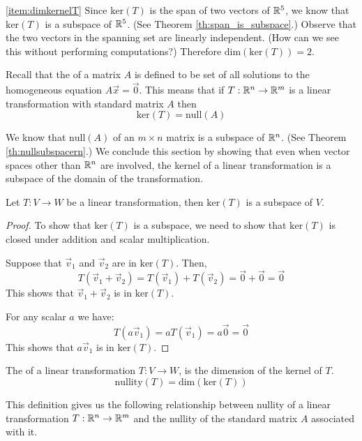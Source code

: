 \documentclass{ximera}
\begin{document}
\begin{example}
\begin{explanation}
\ref{item:dimkernelT}  Since $\mbox{ker}(T)$ is the span of two vectors of $\mathbb{R}^5$, we know that $\mbox{ker}(T)$ is a subspace of $\mathbb{R}^5$. (See Theorem \ref{th:span_is_subspace}.)  Observe that the two vectors in the spanning set are linearly independent. (How can we see this without performing computations?)  Therefore $\mbox{dim}(\mbox{ker}(T))=2$.
\end{explanation}
\end{example}


Recall that the  of a matrix $A$ is defined to be set of all solutions to the homogeneous equation $A\vec{x}=\vec{0}$. This means that  if $T:\mathbb{R}^n\rightarrow \mathbb{R}^m$ is a linear transformation with standard matrix $A$ then
$$\mbox{ker}(T)=\mbox{null}(A)$$

We know that $\mbox{null}(A)$ of an $m\times n$ matrix is a subspace of $\mathbb{R}^n$. (See Theorem \ref{th:nullsubspacern}.)  We conclude this section by showing that even when vector spaces other than $\mathbb{R}^n$ are involved, the kernel of a linear transformation is a subspace of the domain of the transformation.

\begin{theorem}\label{th:kersubspace} Let $T:V\rightarrow W$ be a linear transformation, then $\mbox{ker}(T)$ is a subspace of $V$.
\end{theorem}
\begin{proof}
To show that $\mbox{ker}(T)$ is a subspace, we need to show that $\mbox{ker}(T)$ is closed under addition and scalar multiplication.

Suppose that $\vec{v}_1$ and $\vec{v}_2$ are in $\mbox{ker}(T)$.  Then,
$$T(\vec{v}_1+\vec{v}_2)=T(\vec{v}_1)+T(\vec{v}_2)=\vec{0}+\vec{0}=\vec{0}$$
This shows that $\vec{v}_1+\vec{v}_2$ is in $\mbox{ker}(T)$.

For any scalar $a$ we have:
$$T(a\vec{v}_1)=aT(\vec{v}_1)=a\vec{0}=\vec{0}$$
This shows that $a\vec{v}_1$ is in $\mbox{ker}(T)$.

\end{proof}



\begin{definition}\label{def:nullityT}
The  of a linear transformation $T:V\rightarrow W$, is the dimension of the kernel of $T$.
$$\mbox{nullity}(T)=\mbox{dim}(\mbox{ker}(T))$$
\end{definition}

This definition gives us the following relationship between nullity of a linear transformation $T:\mathbb{R}^n\rightarrow\mathbb{R}^m$ and the nullity of the standard matrix $A$ associated with it.
\end{document}
